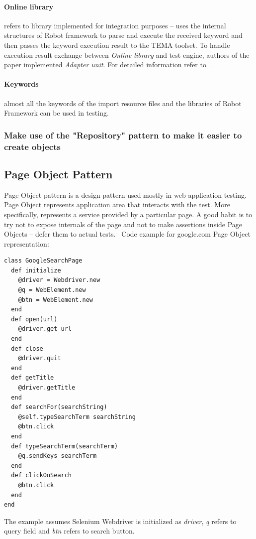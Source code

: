 \documentclass[12pt,twoside]{article}
\begin{document}
\paragraph{Online library}refers to library implemented for integration purposes -- uses the internal structures of Robot framework to parse and execute the received keyword and then passes the keyword execution result to the TEMA toolset. To handle execution result exchange between \emph{Online library} and test engine, authors of the paper implemented \emph{Adapter unit}. For detailed information refer to
~\cite{ref:2.1}.
\paragraph{Keywords} almost all the keywords of the import resource files and the libraries of Robot Framework can be used in testing.

\subsubsection{Make use of the "Repository" pattern to make it easier to create objects}


\subsection{Page Object Pattern}
Page Object pattern is a design pattern used mostly in web application testing. Page Object represents application area that interacts with the test. More specifically, represents a service provided by a particular page. A good habit is to try not to expose internals of the page and not to make assertions inside Page Objects -- defer them to actual tests. 
\ Code example for google.com Page Object representation:

\begin{verbatim}
class GoogleSearchPage
  def initialize
    @driver = Webdriver.new
    @q = WebElement.new
    @btn = WebElement.new
  end
  def open(url)
    @driver.get url
  end
  def close
    @driver.quit
  end
  def getTitle
    @driver.getTitle
  end
  def searchFor(searchString)
    @self.typeSearchTerm searchString
    @btn.click
  end
  def typeSearchTerm(searchTerm)
    @q.sendKeys searchTerm
  end
  def clickOnSearch
    @btn.click
  end
end
\end{verbatim}

The example assumes Selenium Webdriver is initialized as \emph{driver}, \emph{q} refers to query field and \emph{btn} refers to search button.
\end{document}
